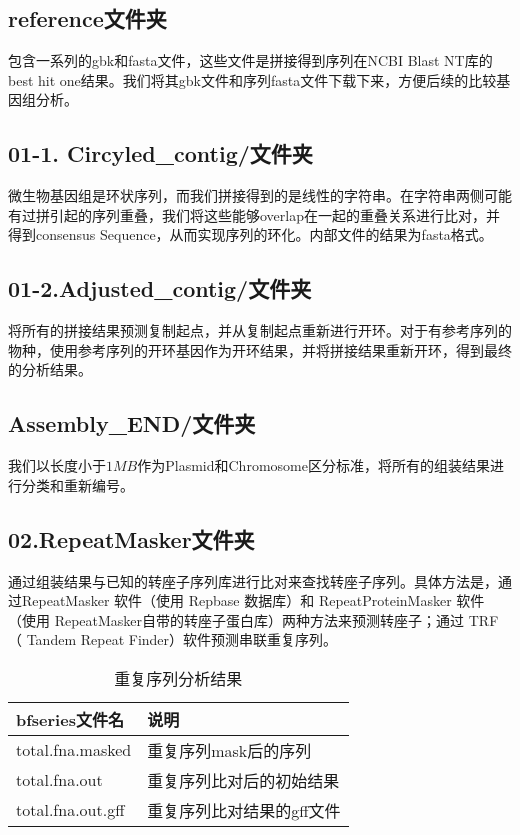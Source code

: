 					
\subsection{reference文件夹}
包含一系列的gbk和fasta文件，这些文件是拼接得到序列在NCBI Blast NT库的best hit one结果。我们将其gbk文件和序列fasta文件下载下来，方便后续的比较基因组分析。
\subsection{01-1. Circyled\_contig/文件夹}
微生物基因组是环状序列，而我们拼接得到的是线性的字符串。在字符串两侧可能有过拼引起的序列重叠，我们将这些能够overlap在一起的重叠关系进行比对，并得到consensus Sequence，从而实现序列的环化。内部文件的结果为fasta格式。
\subsection{01-2.Adjusted\_contig/文件夹}
将所有的拼接结果预测复制起点，并从复制起点重新进行开环。对于有参考序列的物种，使用参考序列的开环基因作为开环结果，并将拼接结果重新开环，得到最终的分析结果。
\subsection{Assembly\_END/文件夹}
我们以长度小于$1MB$作为Plasmid和Chromosome区分标准，将所有的组装结果进行分类和重新编号。

\subsection{02.RepeatMasker文件夹}
通过组装结果与已知的转座子序列库进行比对来查找转座子序列。具体方法是，通过RepeatMasker 软件（使用 Repbase 数据库）和 RepeatProteinMasker 软件（使用 RepeatMasker自带的转座子蛋白库）两种方法来预测转座子；通过 TRF（ Tandem Repeat Finder）软件预测串联重复序列。
\begin{table}[H]
    \caption{重复序列分析结果}
        \begin{center}
            \begin{threeparttable}
                \begin{tabularx}{0.8\textwidth}{XX}

                    \toprule
                    bfseries{文件名}&\bfseries{说明}\\
                    \midrule
                    total.fna.masked&重复序列mask后的序列\\
                    total.fna.out&重复序列比对后的初始结果\\
                    total.fna.out.gff&重复序列比对结果的gff文件\\
                    \bottomrule

                \end{tabularx}

            \end{threeparttable}
        \end{center}
\end{table}





